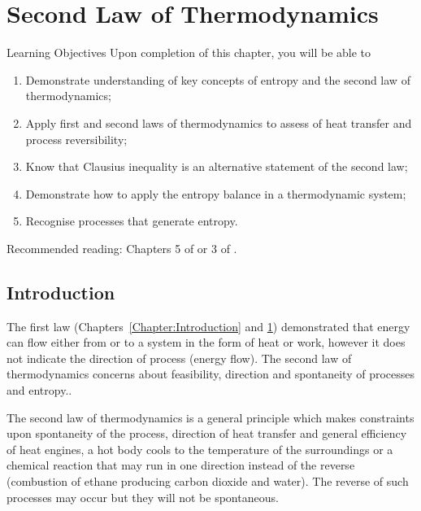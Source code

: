 
\chapter{Second Law of Thermodynamics}\label{Chapter:FirstLaw}

   \begin{LearningObjectivesBlock}{Learning Objectives}
      Upon completion of this chapter, you will be able to
        \begin{enumerate}
           \item Demonstrate understanding of key concepts of entropy and the second law of thermodynamics;
           \item Apply first and second laws of thermodynamics to assess of heat transfer and process reversibility;
           \item Know that Clausius inequality is an alternative statement of the second law;
           \item Demonstrate how to apply the entropy balance in a thermodynamic system;
           \item Recognise processes that generate entropy.
        \end{enumerate}
\medskip
     Recommended reading: Chapters 5 of \citet{SmithVanNess_Book,Moran_Book,Borgnakke_Book} or 3 of \citet{Atkins_Book}.
   \end{LearningObjectivesBlock}

\localtableofcontents


  
   \section{Introduction}\label{Chapter:SecondLaw:Section:Intro}
   The first law (Chapters~\ref{Chapter:Introduction} and \ref{Chapter:FirstLaw}) demonstrated that energy can flow either from or to a system in the form of heat or work, however it does not indicate the direction of process (\ie energy flow). The second law of thermodynamics concerns about feasibility, direction and spontaneity of processes and entropy..
   
The second law of thermodynamics is a general principle which makes constraints upon spontaneity of the process, direction of heat transfer and general efficiency of heat engines, \eg a hot body cools to the temperature of the surroundings or a chemical reaction that may run in one direction instead of the reverse (\eg combustion of ethane producing carbon dioxide and water). The reverse of such processes may occur but they will not be spontaneous.  
  
